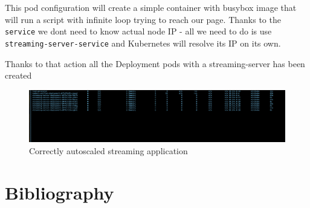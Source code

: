 \documentclass{article}
\begin{document}
This pod configuration will create a simple container with busybox image
that will run a script with infinite loop trying to reach our page.
Thanks to the \texttt{service} we dont need to know actual node IP - all
we need to do is use \texttt{streaming-server-service} and Kubernetes
will resolve its IP on its own.

Thanks to that action all the Deployment pods with a streaming-server has been created
\begin{figure}[H]
  \centering
  \includegraphics[width=\textwidth]{images/9_multiple_deployments.png}
  \caption{Correctly autoscaled streaming application}
  \end{figure}

\newpage
\section*{Bibliography}
\end{document}
